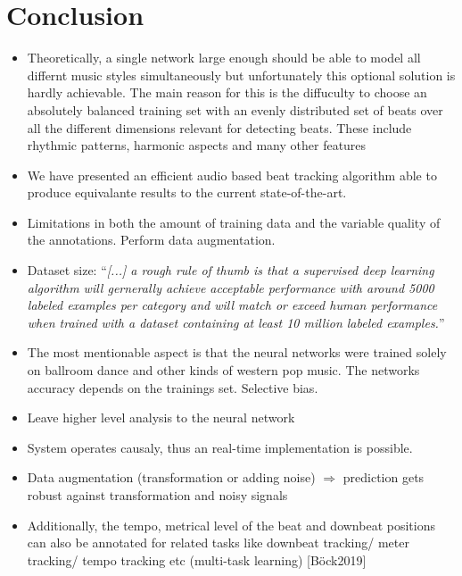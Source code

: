 \documentclass{scrartcl}
\begin{document}
\newpage 

\section{Conclusion}

\begin{itemize}
\item Theoretically, a single network large enough should be able to model all differnt music styles simultaneously but unfortunately this optional solution is hardly achievable. The main reason for this is the diffuculty to choose an absolutely balanced training set with an evenly distributed set of beats over all the different dimensions relevant for detecting beats. These include rhythmic patterns, harmonic aspects and many other features
\item We have presented an efficient audio based beat tracking algorithm able to produce equivalante results to the current state-of-the-art. 
\item Limitations in both the amount of training data and the variable quality of the annotations. Perform data augmentation. 
\item Dataset size: ``\emph{[...] a rough rule of thumb is that a supervised deep learning algorithm will gernerally achieve acceptable performance with around 5000 labeled examples per category and will match or exceed human performance when trained with a dataset containing at least 10 million labeled examples.}'' \cite[Goodfellow2016]{Goodfellow2016}
\item The most mentionable aspect is that the neural networks were trained solely on ballroom dance and other kinds of western pop music. The networks accuracy depends on the trainings set. Selective bias. 
\item Leave higher level analysis to the neural network
\item System operates causaly, thus an real-time implementation is possible.
\item Data augmentation (transformation or adding noise) $\Rightarrow$ prediction gets robust against transformation and noisy signals
\item Additionally, the tempo, metrical level of the beat and downbeat positions can also be annotated for related tasks like downbeat tracking/ meter tracking/ tempo tracking etc (multi-task learning) [Böck2019]
\end{itemize}

\newpage
\end{document}
